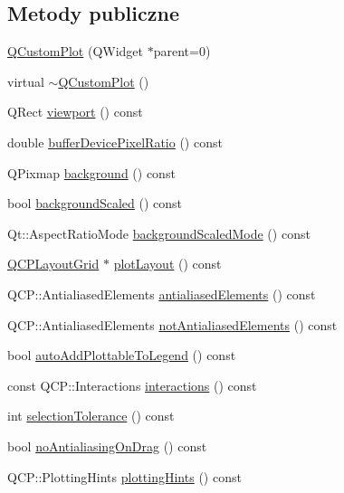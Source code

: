 \subsection*{Metody publiczne}
\begin{DoxyCompactItemize}
\item 
\hyperlink{class_q_custom_plot_a45b99626558651a6428b83972b0b34b8}{Q\+Custom\+Plot} (Q\+Widget $\ast$parent=0)
\item 
virtual \hyperlink{class_q_custom_plot_a75d9b6f599dcae706e45efd425c5499e}{$\sim$\+Q\+Custom\+Plot} ()
\item 
Q\+Rect \hyperlink{class_q_custom_plot_a953ecdbc28018e7e84cb6213ad3d88c2}{viewport} () const 
\item 
double \hyperlink{class_q_custom_plot_a82ba278c2465520017ff269d713dd1bb}{buffer\+Device\+Pixel\+Ratio} () const 
\item 
Q\+Pixmap \hyperlink{class_q_custom_plot_a4643ddc8249cc4f51725650677c2b779}{background} () const 
\item 
bool \hyperlink{class_q_custom_plot_af9a6e0fe88e4b8ae5504ee9646abb121}{background\+Scaled} () const 
\item 
Qt\+::\+Aspect\+Ratio\+Mode \hyperlink{class_q_custom_plot_a3394512baf54fbcdc7613ac44a07c3b6}{background\+Scaled\+Mode} () const 
\item 
\hyperlink{class_q_c_p_layout_grid}{Q\+C\+P\+Layout\+Grid} $\ast$ \hyperlink{class_q_custom_plot_afd280d4d621ae64a106543a545c508d7}{plot\+Layout} () const 
\item 
Q\+C\+P\+::\+Antialiased\+Elements \hyperlink{class_q_custom_plot_a81e954fbb485bb44c609e5707f0067b3}{antialiased\+Elements} () const 
\item 
Q\+C\+P\+::\+Antialiased\+Elements \hyperlink{class_q_custom_plot_a8060cee59757213764382a78d3196189}{not\+Antialiased\+Elements} () const 
\item 
bool \hyperlink{class_q_custom_plot_ad1599fc3fd1833b5988f6b89c1f616ca}{auto\+Add\+Plottable\+To\+Legend} () const 
\item 
const Q\+C\+P\+::\+Interactions \hyperlink{class_q_custom_plot_a12401c02b6949a717f5749bb28c62983}{interactions} () const 
\item 
int \hyperlink{class_q_custom_plot_a7b738074c75e80070ef6a10263c6cd69}{selection\+Tolerance} () const 
\item 
bool \hyperlink{class_q_custom_plot_ae07f2895a34d13a97a10cae4d8e17a36}{no\+Antialiasing\+On\+Drag} () const 
\item 
Q\+C\+P\+::\+Plotting\+Hints \hyperlink{class_q_custom_plot_a130b55e205697a5288081e9fc11e443e}{plotting\+Hints} () const 

\end{DoxyCompactItemize}
